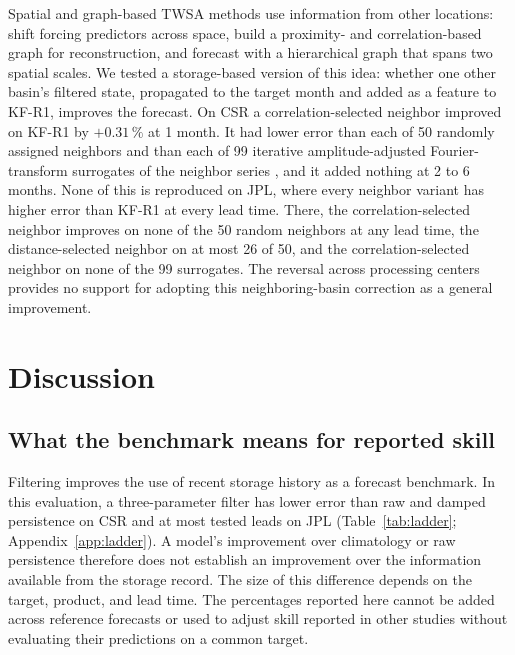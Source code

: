 \documentclass[hess, manuscript]{copernicus}
\begin{document}
Spatial and graph-based TWSA methods use information from other locations:
\citet{li2026fcast} shift forcing predictors across
space, \citet{arzoumanidis2026stgnn} build a proximity- and
correlation-based graph for reconstruction, and \citet{steidl2026hignn}
forecast with a hierarchical graph that spans two spatial scales. We tested a storage-based version of this
idea: whether one other basin's filtered state, propagated to the
target month and added as a feature to KF-R1, improves the forecast. On
CSR a correlation-selected neighbor improved on KF-R1 by
$+0.31\,\%$ at 1 month. It had lower error than each of 50 randomly
assigned neighbors and than each of 99 iterative amplitude-adjusted
Fourier-transform surrogates of the neighbor series
\citep{schreiber1996surrogate}, and it added nothing at 2 to 6 months.
None of this is reproduced on JPL, where every neighbor variant has higher
error than KF-R1 at every lead time. There, the correlation-selected
neighbor improves on none of the 50 random neighbors at any lead time,
the distance-selected neighbor on at most 26 of 50, and the
correlation-selected neighbor on none of the 99 surrogates.
The reversal across processing centers provides no support for adopting
this neighboring-basin correction as a general improvement.

\section{Discussion}
\label{sec:discussion}

\subsection{What the benchmark means for reported skill}
\label{sec:disc-benchmark}

Filtering improves the use of recent storage history as a forecast
benchmark. In this evaluation, a three-parameter filter has lower error
than raw and damped persistence on CSR and at most tested leads on JPL
(Table~\ref{tab:ladder}; Appendix~\ref{app:ladder}). A model's improvement
over climatology or raw persistence therefore does not establish an
improvement over the information available from the storage record.
The size of this difference depends on the target, product, and lead time.
The percentages reported here cannot be added across reference forecasts
or used to adjust skill reported in other studies without evaluating
their predictions on a common target.
\end{document}
